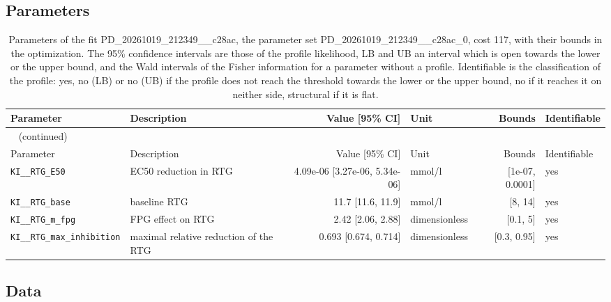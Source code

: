 \documentclass{article}
\begin{document}
\subsection{Parameters}

\begin{longtable}{llrlrl}
\caption{Parameters of the fit PD\_20261019\_212349\_\_c28ac, the parameter set PD\_20261019\_212349\_\_c28ac\_0, cost 117, with their bounds in the optimization. The 95\% confidence intervals are those of the profile likelihood, LB and UB an interval which is open towards the lower or the upper bound, and the Wald intervals of the Fisher information for a parameter without a profile. Identifiable is the classification of the profile: yes, no (LB) or no (UB) if the profile does not reach the threshold towards the lower or the upper bound, no if it reaches it on neither side, structural if it is flat.}\label{tab:parameters:PD_20261019_212349__c28ac} \\
\toprule
Parameter & Description & Value [95\% CI] & Unit & Bounds & Identifiable \\
\midrule
\endfirsthead
\multicolumn{6}{l}{\small\tablename~\thetable{} (continued)} \\
\toprule
Parameter & Description & Value [95\% CI] & Unit & Bounds & Identifiable \\
\midrule
\endhead
\bottomrule
\endlastfoot
\texttt{KI\_\_RTG\_E50} & EC50 reduction in RTG & 4.09e-06 [3.27e-06, 5.34e-06] & mmol/l & [1e-07, 0.0001] & yes \\
\texttt{KI\_\_RTG\_base} & baseline RTG & 11.7 [11.6, 11.9] & mmol/l & [8, 14] & yes \\
\texttt{KI\_\_RTG\_m\_fpg} & FPG effect on RTG & 2.42 [2.06, 2.88] & dimensionless & [0.1, 5] & yes \\
\texttt{KI\_\_RTG\_max\_inhibition} & maximal relative reduction of the RTG & 0.693 [0.674, 0.714] & dimensionless & [0.3, 0.95] & yes \\
\end{longtable}

\subsection{Data}
\end{document}
